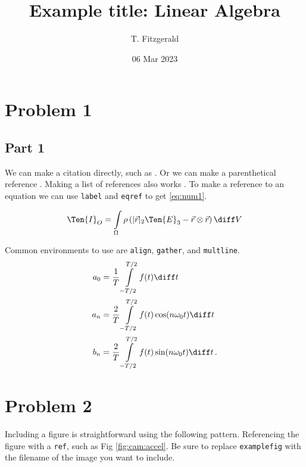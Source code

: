 \documentclass{homework}
\title{Example title: Linear Algebra}
\author{T. Fitzgerald}
\date{06 Mar 2023}
\begin{document}
\maketitle
\tableofcontents

\section{Problem 1}

\subsection{Part 1}
We can make a citation directly, such as \citet{Udwadia2007}.
Or we can make a parenthetical reference \citep{Ackermann1972}.
Making a list of references also works \citep{Willard2018,Akhtaruzzaman2010,Trefethen2015}.
To make a reference to an equation we can use \texttt{label} and \texttt{eqref} to get \eqref{eq:num1}.

\begin{align}\label{eq:num1}
    \Ten{I}_O = \int\limits_\Omega \rho \left( |\Vec{r}|_2 \Ten{E}_3 - \Vec{r} \otimes \Vec{r}  \right) \diff V
\end{align}

Common environments to use are \texttt{align}, \texttt{gather}, and \texttt{multline}.
\begin{align}
    a_0 &= \frac{1}{T}\int\limits_{-T/2}^{T/2} f(t)\diff t
    \\
    a_n &= \frac{2}{T} \int\limits_{-T/2}^{T/2} f(t) \cos(n \omega_0 t)\diff t
    \\
    b_n &= \frac{2}{T} \int\limits_{-T/2}^{T/2} f(t) \sin(n \omega_0 t)\diff t \, .
\end{align}
  

\newpage
\section{Problem 2}

Including a figure is straightforward using the following pattern.
Referencing the figure with a \texttt{ref}, such as Fig \ref{fig:cam:accel}.
Be sure to replace \texttt{examplefig} with the filename of the image you want to include.
\end{document}
